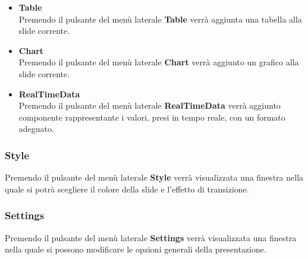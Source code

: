 \begin{itemize}
\begin{figure}[h]
    \end{figure}
 \item \textbf{Table}\\
    Premendo il pulsante del menù laterale \textbf{Table} verrà aggiunta una tabella alla slide corrente.
 \item \textbf{Chart}\\
    Premendo il pulsante del menù laterale \textbf{Chart} verrà aggiunto un grafico alla slide corrente.
 \item \textbf{RealTimeData}\\
    Premendo il pulsante del menù laterale \textbf{RealTimeData} verrà aggiunto componente rappresentante i valori, presi in tempo reale, con un formato adeguato.
\end{itemize}


\subsubsection{Style}
Premendo il pulsante del menù laterale \textbf{Style} verrà visualizzata una finestra nella quale si potrà scegliere il colore della slide e l'effetto di transizione.
\subsubsection{Settings}
Premendo il pulsante del menù laterale \textbf{Settings} verrà visualizzata una finestra nella quale si possono modificare le opzioni generali della presentazione.

